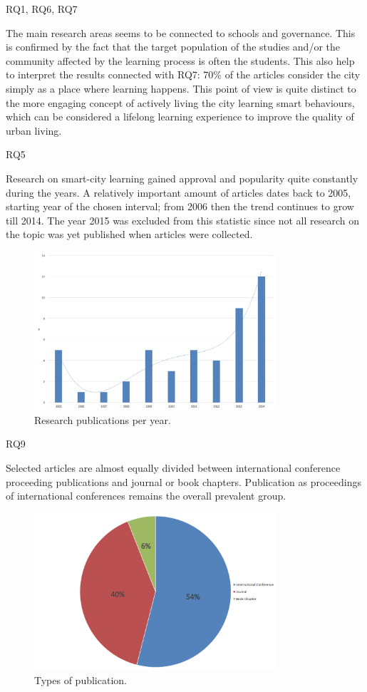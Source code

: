 RQ1, RQ6, RQ7

The main research areas seems to be connected to schools and governance.
This is confirmed by the fact that the target population of the studies and/or the community affected by the learning process is often the students.
This also help to interpret the results connected with RQ7: 70\% of the articles consider the city simply as a place where learning happens. This point of view is quite distinct to the more engaging concept of actively living the city learning smart behaviours, which can be considered a lifelong learning experience to improve the quality of urban living.


RQ5

Research on smart-city learning gained approval and popularity quite constantly during the years. A relatively important amount of articles dates back to 2005, starting year of the chosen interval; from 2006 then the trend continues to grow till 2014. The year 2015 was excluded from this statistic since not all research on the topic was yet published when articles were collected.

\begin{figure}[tbh]
\centering
\includegraphics[width=9cm]{img/years}
\caption{Research publications per year.}
\label{fig:years}
\end{figure}


RQ9

Selected articles are almost equally divided between international conference proceeding publications and journal or book chapters.
Publication as proceedings of international conferences remains the overall prevalent group.

\begin{figure}[tbh]
\centering
\includegraphics[width=9cm]{img/publication}
\caption{Types of publication.}
\label{fig:publications}
\end{figure}


